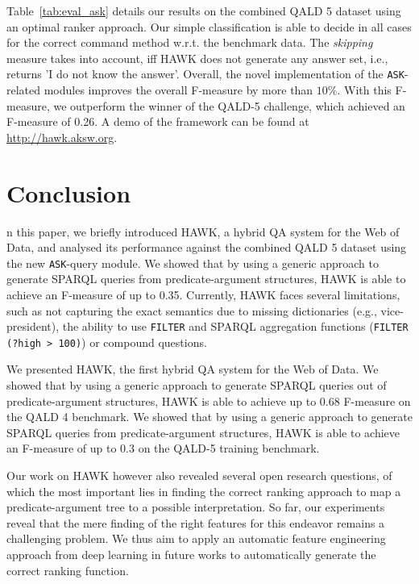 Table~\ref{tab:eval_ask} details our results on the combined QALD 5 dataset using an optimal ranker approach. 
Our simple classification is able to decide in all cases for the correct command method w.r.t. the benchmark data.
The \emph{skipping} measure takes into account, iff HAWK does not generate any answer set, i.e., returns 'I do not know the answer'.
Overall, the novel implementation of the \texttt{ASK}-related modules improves the overall F-measure by more than $10\%$. With this F-measure, we outperform the winner of the QALD-5 challenge, which achieved an F-measure of 0.26. 
A demo of the framework can be found at \url{http://hawk.aksw.org}.



\section{Conclusion}
\label{chahawk:sec:conclusion}
n this paper, we briefly introduced HAWK, a hybrid QA system for the Web of Data, and analysed its performance against the combined QALD 5 dataset using the new \texttt{ASK}-query module. 
We showed that by using a generic approach to generate SPARQL queries from predicate-argument structures, HAWK is able to achieve an F-measure of up to 0.35.
Currently, HAWK faces several limitations, such as not capturing the exact semantics due to missing dictionaries (e.g., vice-president), the ability to use \texttt{FILTER} and SPARQL aggregation functions (\texttt{FILTER (?high > 100)}) or compound questions. 

We presented HAWK, the first hybrid QA system for the Web of Data. We showed that by using a generic approach to generate SPARQL queries out of predicate-argument structures, HAWK is able to achieve up to 0.68 F-measure on the \ac{QALD} 4 benchmark. 
We showed that by using a generic approach to generate SPARQL queries from predicate-argument structures, HAWK is able to achieve an F-measure of up to 0.3 on the QALD-5 training benchmark. 


Our work on HAWK however also revealed several open research questions, of which the most important lies in finding the correct ranking approach to map a predicate-argument tree to a possible interpretation. So far, our experiments reveal that the mere finding of the right features for this endeavor remains a challenging problem. We thus aim to apply an automatic feature engineering approach from deep learning in future works to automatically generate the correct ranking function. 

